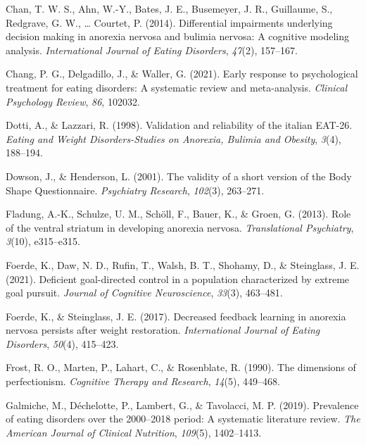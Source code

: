 \documentclass[
  man,floatsintext]{apa6}
\newlength{\cslhangindent}
\newlength{\cslentryspacingunit} %
\newenvironment{CSLReferences}[2] %
 {%
  \setlength{\parindent}{0pt}
  \ifodd #1
  \let\oldpar\par
  \def\par{\hangindent=\cslhangindent\oldpar}
  \fi
  \setlength{\parskip}{#2\cslentryspacingunit}
 }%
 {}
\begin{document}
\begin{CSLReferences}{1}{0}
\leavevmode{}%
Chan, T. W. S., Ahn, W.-Y., Bates, J. E., Busemeyer, J. R., Guillaume, S., Redgrave, G. W., \ldots{} Courtet, P. (2014). Differential impairments underlying decision making in anorexia nervosa and bulimia nervosa: A cognitive modeling analysis. \emph{International Journal of Eating Disorders}, \emph{47}(2), 157--167.

\leavevmode{}%
Chang, P. G., Delgadillo, J., \& Waller, G. (2021). Early response to psychological treatment for eating disorders: A systematic review and meta-analysis. \emph{Clinical Psychology Review}, \emph{86}, 102032.

\leavevmode{}%
Dotti, A., \& Lazzari, R. (1998). Validation and reliability of the italian {EAT-26}. \emph{Eating and Weight Disorders-Studies on Anorexia, Bulimia and Obesity}, \emph{3}(4), 188--194.

\leavevmode{}%
Dowson, J., \& Henderson, L. (2001). The validity of a short version of the {Body Shape Questionnaire}. \emph{Psychiatry Research}, \emph{102}(3), 263--271.

\leavevmode{}%
Fladung, A.-K., Schulze, U. M., Schöll, F., Bauer, K., \& Groen, G. (2013). Role of the ventral striatum in developing anorexia nervosa. \emph{Translational Psychiatry}, \emph{3}(10), e315--e315.

\leavevmode{}%
Foerde, K., Daw, N. D., Rufin, T., Walsh, B. T., Shohamy, D., \& Steinglass, J. E. (2021). Deficient goal-directed control in a population characterized by extreme goal pursuit. \emph{Journal of Cognitive Neuroscience}, \emph{33}(3), 463--481.

\leavevmode{}%
Foerde, K., \& Steinglass, J. E. (2017). Decreased feedback learning in anorexia nervosa persists after weight restoration. \emph{International Journal of Eating Disorders}, \emph{50}(4), 415--423.

\leavevmode{}%
Frost, R. O., Marten, P., Lahart, C., \& Rosenblate, R. (1990). The dimensions of perfectionism. \emph{Cognitive Therapy and Research}, \emph{14}(5), 449--468.

\leavevmode{}%
Galmiche, M., Déchelotte, P., Lambert, G., \& Tavolacci, M. P. (2019). Prevalence of eating disorders over the 2000--2018 period: A systematic literature review. \emph{The American Journal of Clinical Nutrition}, \emph{109}(5), 1402--1413.


\end{CSLReferences}
\end{document}
